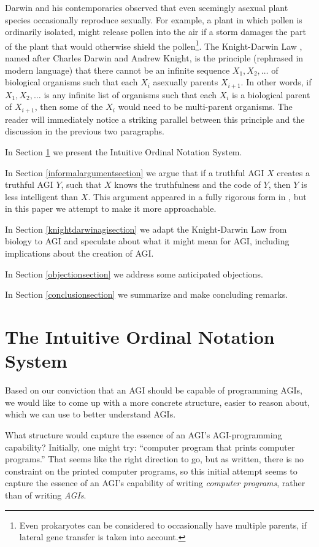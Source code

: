 \documentclass[runningheads]{llncs}
\begin{document}
Darwin and his contemporaries observed that even
seemingly asexual plant species occasionally reproduce sexually.
For example, a plant in which pollen is ordinarily isolated, might
release pollen into the air if a storm damages the part of the
plant that would otherwise shield the pollen\footnote{Even prokaryotes can
be considered to occasionally have multiple parents, if lateral gene
transfer is taken into account.}.
The Knight-Darwin Law \cite{darwin1898knight}, named after Charles Darwin
and Andrew Knight, is the
principle (rephrased in modern language) that there cannot be an infinite
sequence $X_1,X_2,\ldots$ of biological organisms such that each $X_i$ asexually
parents $X_{i+1}$. In other words, if $X_1,X_2,\ldots$ is any infinite list of
organisms such that each $X_i$ is a biological parent of $X_{i+1}$, then some of the
$X_i$ would need to be multi-parent organisms.
The reader will immediately notice a striking parallel between
this principle and the discussion in the previous two paragraphs.

In Section \ref{notationsystemsection} we present the Intuitive Ordinal Notation
System.

In Section \ref{informalargumentsection} we argue that if a truthful AGI $X$ creates
a truthful AGI $Y$, such that $X$
knows the truthfulness and the code of $Y$, then $Y$ is less intelligent
than $X$. This argument appeared in a fully rigorous form in \cite{alexander2019measuring},
but in this paper we attempt to make it more approachable.

In Section \ref{knightdarwinagisection} we adapt the Knight-Darwin Law from biology to AGI
and speculate about what it might mean for AGI, including implications about
the creation of AGI.

In Section \ref{objectionsection} we address some anticipated objections.

In Section \ref{conclusionsection} we summarize and make concluding remarks.


\section{The Intuitive Ordinal Notation System}
\label{notationsystemsection}

Based on our conviction that an AGI should be capable of programming AGIs,
we would like to come up with a more concrete structure, easier to reason
about, which we can use to better understand AGIs.

What structure would capture the essence of an AGI's AGI-programming
capability? Initially, one might try: ``computer
program that prints computer programs.'' That seems like the right direction
to go, but as written, there is no constraint on the printed computer programs, so
this initial attempt seems to capture the essence of an
AGI's capability of writing \emph{computer programs}, rather than of writing \emph{AGIs}.
\end{document}
